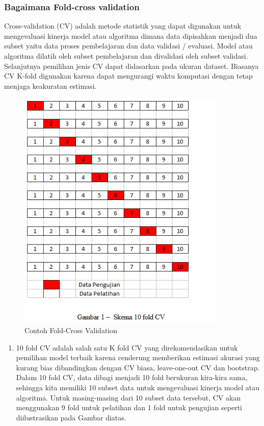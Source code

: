 \subsubsection{Bagaimana Fold-cross validation}

Cross-validation (CV) adalah metode statistik yang dapat digunakan untuk mengevaluasi kinerja model atau algoritma dimana data dipisahkan menjadi dua subset yaitu data proses pembelajaran dan data validasi / evaluasi. Model atau algoritma dilatih oleh subset pembelajaran dan divalidasi oleh subset validasi. Selanjutnya pemilihan jenis CV dapat didasarkan pada ukuran dataset. Biasanya CV K-fold digunakan karena dapat mengurangi waktu komputasi dengan tetap menjaga keakuratan estimasi.

\begin{figure}[H]
\centerline{\includegraphics[width=10cm]{figures/1174080/2/7.png}}
\caption{Contoh Fold-Cross Validation}
\label{labelgambar}
\end{figure}
\begin{enumerate}
\item 10 fold CV adalah salah satu K fold CV yang direkomendasikan untuk pemilihan model terbaik karena cenderung memberikan estimasi akurasi yang kurang bias dibandingkan dengan CV biasa, leave-one-out CV dan bootstrap. Dalam 10 fold CV, data dibagi menjadi 10 fold berukuran kira-kira sama, sehingga kita memiliki 10 subset data untuk mengevaluasi kinerja model atau algoritma. Untuk masing-masing dari 10 subset data tersebut, CV akan menggunakan 9 fold untuk pelatihan dan 1 fold untuk pengujian seperti diilustrasikan pada Gambar diatas.
\end{enumerate}

